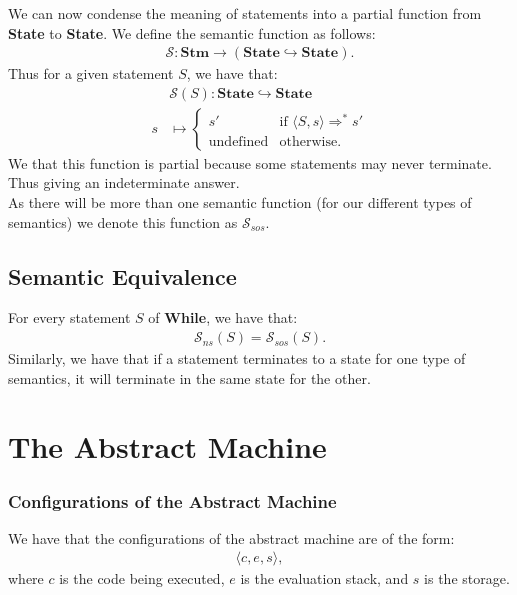 \documentclass[a4paper, 12pt, twoside]{article}
\begin{document}
We can now condense the meaning of statements into a partial
function from \textbf{State} to \textbf{State}. We define the semantic
function as follows: \begin{gather*}
  \mathcal{S}: \textbf{Stm} \to (\textbf{State} \hookrightarrow \textbf{State}).
\end{gather*} Thus for a given statement $S$, we have that: \begin{align*}
  &\mathcal{S}(S) : \textbf{State} \hookrightarrow \textbf{State} \\
  s &\mapsto \begin{cases}
    s' & \text{if } \langle S, s \rangle \Rightarrow^* s' \\
    \text{undefined} & \text{otherwise}.
  \end{cases}
\end{align*} We that this function is partial because some statements
may never terminate. Thus giving an indeterminate answer.
\\[\baselineskip]
As there will be more than one semantic function (for our different types
of semantics) we denote this function as $\mathcal{S}_{sos}$.

\subsection{Semantic Equivalence}

For every statement $S$ of \textbf{While}, we have that: \begin{gather*}
  \mathcal{S}_{ns}(S) = \mathcal{S}_{sos}(S).
\end{gather*} Similarly, we have that if a statement terminates to a state
for one type of semantics, it will terminate in the same state for the other.

\section{The Abstract Machine}

\subsubsection{Configurations of the Abstract Machine}

We have that the configurations of the abstract machine are of the 
form: \begin{gather*}
  \langle c, e, s \rangle,
\end{gather*} where $c$ is the code being executed, $e$ is the
evaluation stack, and $s$ is the storage.
\end{document}
